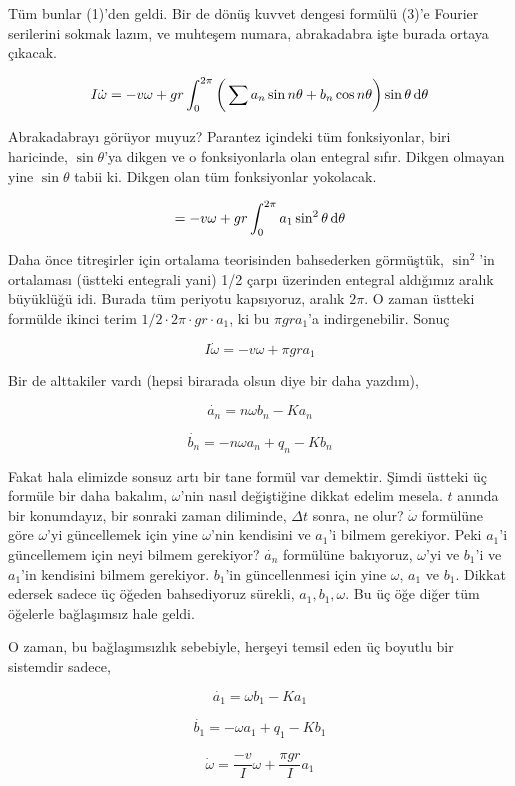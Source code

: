 \documentclass[12pt,fleqn]{article}\usepackage{../../common}
\begin{document}
Tüm bunlar (1)'den geldi. Bir de dönüş kuvvet dengesi formülü (3)'e Fourier
serilerini sokmak lazım, ve muhteşem numara, abrakadabra işte burada ortaya
çıkacak. 

$$ 
I \dot{\omega} = - v \omega + gr \int _{0}^{2\pi} 
\bigg(\sum a_n \sin n\theta + b_n \cos n\theta \bigg) \sin\theta \,\mathrm{d} \theta
$$

Abrakadabrayı görüyor muyuz? Parantez içindeki tüm fonksiyonlar, biri
haricinde, $\sin\theta$'ya dikgen ve o fonksiyonlarla olan entegral
sıfır. Dikgen olmayan yine $\sin\theta$ tabii ki. Dikgen olan tüm
fonksiyonlar yokolacak.

$$   = - v \omega + gr \int _{0}^{2\pi} a_1 \sin^2 \theta\,\mathrm{d}\theta $$

Daha önce titreşirler için ortalama teorisinden bahsederken görmüştük,
$\sin^2$'in ortalaması (üstteki entegrali yani) 1/2 çarpı üzerinden
entegral aldığımız aralık büyüklüğü idi. Burada tüm periyotu kapsıyoruz,
aralık $2\pi$. O zaman üstteki formülde ikinci terim
$1/2 \cdot 2\pi \cdot gr \cdot a_1 $, ki bu $\pi gr a_1$'a
indirgenebilir. Sonuç

$$ I \dot{\omega} = -v \omega + \pi gr a_1 $$

Bir de alttakiler vardı (hepsi birarada olsun diye bir daha yazdım),

$$ 
\dot{a_n} = n \omega b_n - K a_n 
$$

$$ 
\dot{b_n} = -n \omega a_n + q_n - K b_n 
$$

Fakat hala elimizde sonsuz artı bir tane formül var demektir. Şimdi üstteki
üç formüle bir daha bakalım, $\omega$'nin nasıl değiştiğine dikkat edelim
mesela. $t$ anında bir konumdayız, bir sonraki zaman diliminde, $\Delta t$
sonra, ne olur? $\dot{\omega}$ formülüne göre $\omega$'yi güncellemek için
yine $\omega$'nin kendisini ve $a_1$'i bilmem gerekiyor. Peki $a_1$'i
güncellemem için neyi bilmem gerekiyor? $\dot{a_n}$ formülüne bakıyoruz,
$\omega$'yi ve $b_1$'i ve $a_1$'in kendisini bilmem gerekiyor. $b_1$'in
güncellenmesi için yine $\omega$, $a_1$ ve $b_1$. Dikkat edersek sadece üç
öğeden bahsediyoruz sürekli, $a_1,b_1,\omega$. Bu üç öğe diğer tüm öğelerle
bağlaşımsız hale geldi. 

O zaman, bu bağlaşımsızlık sebebiyle, herşeyi temsil eden üç boyutlu bir
sistemdir sadece, 

$$ \dot{a_1} = \omega b_1 - K a_1 $$

$$ \dot{b_1} = -\omega a_1 + q_1 - Kb_1 $$

$$ \dot{\omega} = \frac{-v}{I}\omega + \frac{\pi gr}{I} a_1 $$
\end{document}
